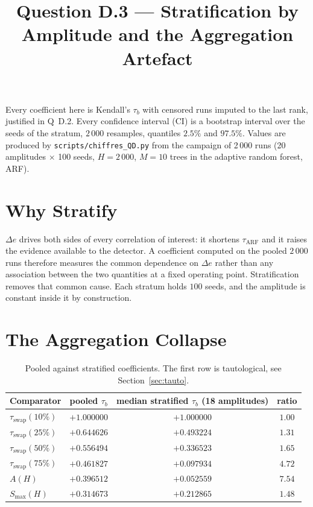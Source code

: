 \documentclass[11pt,a4paper]{article}
\title{Question D.3 --- Stratification by Amplitude and the Aggregation Artefact}
\author{}
\date{}
\begin{document}
\maketitle

\noindent Every coefficient here is Kendall's $\tau_b$ with censored runs imputed to the
last rank, justified in Q~D.2. Every confidence interval (CI) is a bootstrap interval over
the seeds of the stratum, $2\,000$ resamples, quantiles $2.5\%$ and $97.5\%$. Values are produced by
\texttt{scripts/chiffres\_QD.py} from the campaign of 2\,000 runs (20 amplitudes $\times$
100 seeds, $H = 2\,000$, $M = 10$ trees in the adaptive random forest, ARF).

\section{Why Stratify}

$\Delta e$ drives both sides of every correlation of interest: it shortens
$\tau_{\mathrm{ARF}}$ and it raises the evidence available to the detector. A coefficient
computed on the pooled $2\,000$ runs therefore measures the common dependence on
$\Delta e$ rather than any association between the two quantities at a fixed operating
point. Stratification removes that common cause. Each stratum holds $100$ seeds, and the
amplitude is constant inside it by construction.

\section{The Aggregation Collapse}

\begin{table}[htbp]
  \centering
  \begin{tabular}{lccc}
    \toprule
    Comparator & pooled $\tau_b$ & median stratified $\tau_b$ (18 amplitudes) & ratio \\
    \midrule
    $\tau_{\mathrm{swap}}(10\%)$ & $+1.000000$ & $+1.000000$ & $1.00$ \\
    $\tau_{\mathrm{swap}}(25\%)$ & $+0.644626$ & $+0.493224$ & $1.31$ \\
    $\tau_{\mathrm{swap}}(50\%)$ & $+0.556494$ & $+0.336523$ & $1.65$ \\
    $\tau_{\mathrm{swap}}(75\%)$ & $+0.461827$ & $+0.097934$ & $4.72$ \\
    $A(H)$                       & $+0.396512$ & $+0.052559$ & $7.54$ \\
    $S_{\max}(H)$                & $+0.314673$ & $+0.212865$ & $1.48$ \\
    \bottomrule
  \end{tabular}
  \caption{Pooled against stratified coefficients. The first row is tautological, see
  Section~\ref{sec:tauto}.}
  \label{tab:agregation}
\end{table}
\end{document}
